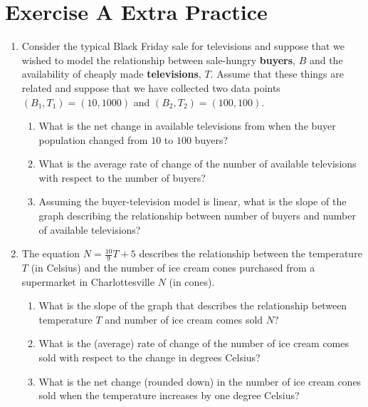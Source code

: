 \documentclass[10pt]{article}
\begin{document}
\pagestyle{otherpages}
\thispagestyle{firstpage}

\section{Exercise A Extra Practice}

\begin{enumerate}

\item[(a)] Consider the typical Black Friday sale for televisions and suppose that we wished to model the relationship between sale-hungry \textbf{buyers}, $B$ and the availability of cheaply made \textbf{televisions}, $T$. Assume that these things are related and suppose that we have collected two data points $(B_1, T_1) = (10, 1000)$ and $(B_2, T_2) = (100, 100).$
    \begin{enumerate}
        \item[(i)] What is the net change in available televisions from when the buyer population changed from $10$ to $100$ buyers?
        \item[(ii)]What is the average rate of change of the number of available televisions with respect to the number of buyers?
        \item[(iii)]Assuming the buyer-television model is linear, what is the slope of the graph describing the relationship between number of buyers and number of available televisions?
    \end{enumerate}
\item[(b)] The equation $N = \frac{10}{9}T + 5$ describes the relationship between the temperature $T$ (in Celsius) and the number of ice cream cones purchased from a supermarket in Charlottesville $N$ (in cones).
    \begin{enumerate}
        \item[(i)] What is the slope of the graph that describes the relationship between temperature $T$ and number of ice cream comes sold $N?$
        \item[(ii)]What is the (average) rate of change of the number of ice cream comes sold with respect to the change in degrees Celsius?
        \item[(iii)] What is the net change (rounded down) in the number of ice cream cones sold when the temperature increases by one degree Celsius?
    \end{enumerate}

\end{enumerate}
\end{document}
